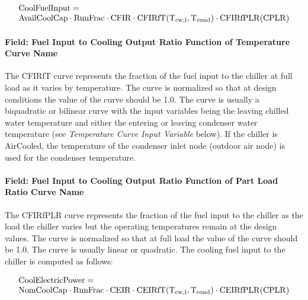 \begin{equation}
    \begin{array}{l}
        \rm{CoolFuelInput} = \\
        \rm{AvailCoolCap} \cdot \rm{RunFrac} \cdot \rm{CFIR} \cdot \rm{CFIRfT}( T_{cw,l}, {T_{\rm{cond}}}) \cdot \rm{CFIRfPLR}( \rm{CPLR} )
    \end{array}
\end{equation}

\paragraph{Field: Fuel Input to Cooling Output Ratio Function of Temperature Curve Name}\label{field-fuel-input-to-cooling-output-ratio-function-of-temperature-curve-name}

The CFIRfT curve represents the fraction of the fuel input to the chiller at full load as it varies by temperature. The curve is normalized so that at design conditions the value of the curve should be 1.0. The curve is usually a biquadratic or bilinear curve with the input variables being the leaving chilled water temperature and either the entering or leaving condenser water temperature (see \emph{Temperature Curve Input Variable} below). If the chiller is AirCooled, the temperature of the condenser inlet node (outdoor air node) is used for the condenser temperature.

\paragraph{Field: Fuel Input to Cooling Output Ratio Function of Part Load Ratio Curve Name}\label{field-fuel-input-to-cooling-output-ratio-function-of-part-load-ratio-curve-name}

The CFIRfPLR curve represents the fraction of the fuel input to the chiller as the load the chiller varies but the operating temperatures remain at the design values. The curve is normalized so that at full load the value of the curve should be 1.0. The curve is usually linear or quadratic. The cooling fuel input to the chiller is computed as follows:

\begin{equation}
    \begin{array}{l}
        \rm{CoolElectricPower} = \\
        \rm{NomCoolCap} \cdot \rm{RunFrac} \cdot \rm{CEIR} \cdot \rm{CEIRfT}(T_{cw,l}, T_{cond}) \cdot \rm{CEIRfPLR}(\rm{CPLR})
    \end{array}
\end{equation}

